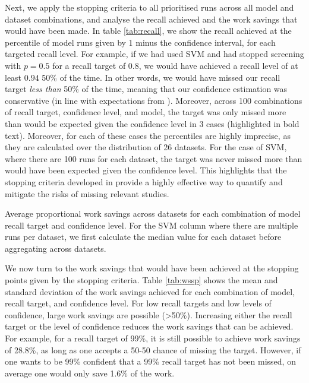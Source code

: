 \documentclass{article}
\begin{document}
	Next, we apply the stopping criteria to all prioritised runs across all model and dataset combinations, and analyse the recall achieved and the work savings that would have been made. In table \ref{tab:recall}, we show the recall achieved at the percentile of model runs given by 1 minus the confidence interval, for each targeted recall level. 
	For example, if we had used SVM and had stopped screening with $p=0.5$ for a recall target of $0.8$, we would have achieved a recall level of at least $0.94$ 50\% of the time. In other words, we would have missed our recall target \textit{less than} 50\% of the time, meaning that our confidence estimation was conservative (in line with expectations from \cite{callaghan_statistical_2020}).
	Moreover, across 100 combinations of recall target, confidence level, and model, the target was only missed more than would be expected given the confidence level in 3 cases (highlighted in bold text). Moreover, for each of these cases the percentiles are highly imprecise, as they are calculated over the distribution of 26 datasets. For the case of SVM, where there are 100 runs for each dataset, the target was never missed more than would have been expected given the confidence level. This highlights that the stopping criteria developed in \cite{callaghan_statistical_2020} provide a highly effective way to quantify and mitigate the risks of missing relevant studies.
	
	\begin{table}
		\centering
		
		\caption{Average proportional work savings across datasets for each combination of  model recall target and confidence level. For the SVM column where there are multiple runs per dataset, we first calculate the median value for each dataset before aggregating across datasets.}
		\label{tab:wssp}
	\end{table}
	
	We now turn to the work savings that would have been achieved at the stopping points given by the stopping criteria. Table \ref{tab:wssp} shows the mean and standard deviation of the work savings achieved for each combination of model, recall target, and confidence level. For low recall targets and low levels of confidence, large work savings are possible (>50\%). Increasing either the recall target or the level of confidence reduces the work savings that can be achieved. For example, for a recall target of 99\%, it is still possible to achieve work savings of 28.8\%, as long as one accepts a 50-50 chance of missing the target. However, if one wants to be 99\% confident that a 99\% recall target has not been missed, on average one would only save 1.6\% of the work.
	
\end{document}
